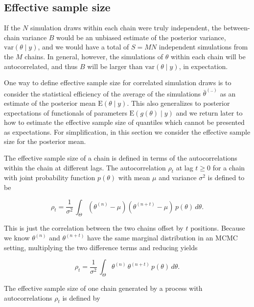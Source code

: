 \documentclass[american,]{article}
\begin{document}
\hypertarget{ESS}{%
\subsection{Effective sample size}\label{ESS}}

If the \(N\) simulation draws within each chain were truly independent,
the between-chain variance \(B\) would be an unbiased estimate of the
posterior variance, \(\mbox{var}(\theta \mid y)\), and we would have a
total of \(S = MN\) independent simulations from the \(M\) chains. In
general, however, the simulations of \(\theta\) within each chain will
be autocorrelated, and thus \(B\) will be larger than
\(\mbox{var}(\theta \mid y)\), in expectation.

One way to define effective sample size for correlated simulation draws
is to consider the statistical efficiency of the average of the
simulations \(\bar{\theta}^{(..)}\) as an estimate of the posterior mean
\(\mbox{E}(\theta \mid y)\). This also generalizes to posterior
expectations of functionals of parameters \(\mbox{E}(g(\theta) \mid y)\)
and we return later to how to estimate the effective sample size of
quantiles which cannot be presented as expectations. For simplification,
in this section we consider the effective sample size for the posterior
mean.

The effective sample size of a chain is defined in terms of the
autocorrelations within the chain at different lags. The autocorrelation
\(\rho_t\) at lag \(t \geq 0\) for a chain with joint probability
function \(p(\theta)\) with mean \(\mu\) and variance \(\sigma^2\) is
defined to be

\begin{equation}
\rho_t = \frac{1}{\sigma^2} \, \int_{\Theta} (\theta^{(n)} - \mu)
(\theta^{(n+t)} - \mu) \, p(\theta) \, d \theta.
\end{equation}

This is just the correlation between the two chains offset by \(t\)
positions. Because we know \(\theta^{(n)}\) and \(\theta^{(n+t)}\) have
the same marginal distribution in an MCMC setting, multiplying the two
difference terms and reducing yields

\begin{equation}
\rho_t = \frac{1}{\sigma^2} \, \int_{\Theta} \theta^{(n)} \, \theta^{(n+t)}
\, p(\theta) \, d \theta.
\end{equation}

The effective sample size of one chain generated by a process with
autocorrelations \(\rho_t\) is defined by
\end{document}
